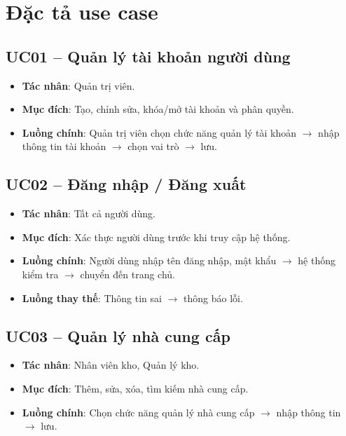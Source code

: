 \section{Đặc tả use case}

\subsection{UC01 -- Quản lý tài khoản người dùng}

\begin{itemize}[leftmargin=1.5cm]
    \item \textbf{Tác nhân}: Quản trị viên.
    \item \textbf{Mục đích}: Tạo, chỉnh sửa, khóa/mở tài khoản và phân quyền.
    \item \textbf{Luồng chính}: Quản trị viên chọn chức năng quản lý tài khoản $\rightarrow$ nhập thông tin tài khoản $\rightarrow$ chọn vai trò $\rightarrow$ lưu.
\end{itemize}

\subsection{UC02 -- Đăng nhập / Đăng xuất}

\begin{itemize}[leftmargin=1.5cm]
    \item \textbf{Tác nhân}: Tất cả người dùng.
    \item \textbf{Mục đích}: Xác thực người dùng trước khi truy cập hệ thống.
    \item \textbf{Luồng chính}: Người dùng nhập tên đăng nhập, mật khẩu $\rightarrow$ hệ thống kiểm tra $\rightarrow$ chuyển đến trang chủ.
    \item \textbf{Luồng thay thế}: Thông tin sai $\rightarrow$ thông báo lỗi.
\end{itemize}

\subsection{UC03 -- Quản lý nhà cung cấp}

\begin{itemize}[leftmargin=1.5cm]
    \item \textbf{Tác nhân}: Nhân viên kho, Quản lý kho.
    \item \textbf{Mục đích}: Thêm, sửa, xóa, tìm kiếm nhà cung cấp.
    \item \textbf{Luồng chính}: Chọn chức năng quản lý nhà cung cấp $\rightarrow$ nhập thông tin $\rightarrow$ lưu.
\end{itemize}

